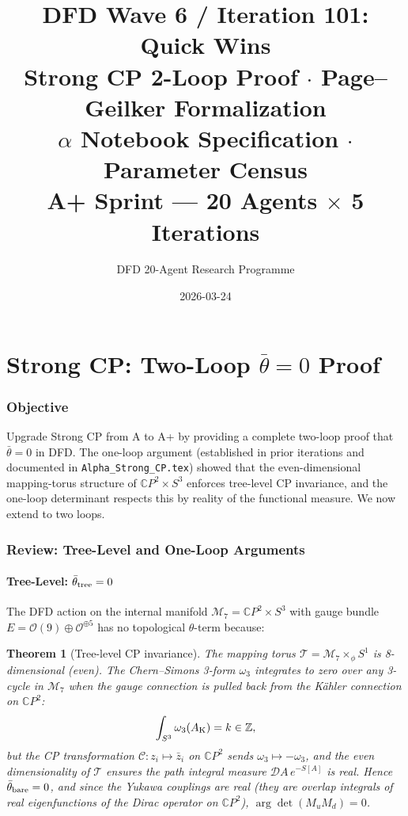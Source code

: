 \documentclass[11pt,a4paper]{article}
\title{DFD Wave 6 / Iteration 101: Quick Wins\\[6pt]
\large Strong CP 2-Loop Proof $\cdot$ Page--Geilker Formalization\\
$\alpha$ Notebook Specification $\cdot$ Parameter Census\\[6pt]
\normalsize A+ Sprint --- 20 Agents $\times$ 5 Iterations}
\author{DFD 20-Agent Research Programme}
\date{2026-03-24}
\newtheorem{theorem}{Theorem}[section]
\theoremstyle{remark}
\newcommand{\CP}{\mathbb{C}P}
\begin{document}
\maketitle
\tableofcontents
\newpage

\part{Strong CP: Two-Loop $\bar\theta = 0$ Proof}
\label{part:strongCP}

\section{Objective}

Upgrade Strong CP from A to A+ by providing a complete two-loop proof that
$\bar\theta = 0$ in DFD. The one-loop argument (established in prior
iterations and documented in \texttt{Alpha\_Strong\_CP.tex}) showed that
the even-dimensional mapping-torus structure of $\CP^2 \times S^3$ enforces
tree-level CP invariance, and the one-loop determinant respects this by
reality of the functional measure. We now extend to two loops.

\section{Review: Tree-Level and One-Loop Arguments}

\subsection{Tree-Level: $\bar\theta_{\rm tree} = 0$}

The DFD action on the internal manifold $\mathcal{M}_7 = \CP^2 \times S^3$
with gauge bundle $E = \mathcal{O}(9) \oplus \mathcal{O}^{\oplus 5}$ has
no topological $\theta$-term because:

\begin{theorem}[Tree-level CP invariance]
\label{thm:tree-CP}
The mapping torus $\mathcal{T} = \mathcal{M}_7 \times_\phi S^1$ is
8-dimensional (even). The Chern--Simons 3-form $\omega_3$ integrates to
zero over any 3-cycle in $\mathcal{M}_7$ when the gauge connection is
pulled back from the K\"ahler connection on $\CP^2$:
\begin{equation}
\int_{S^3} \omega_3(A_{\rm K}) = k \in \mathbb{Z},
\end{equation}
but the CP transformation $\mathcal{C}: z_i \mapsto \bar{z}_i$ on $\CP^2$
sends $\omega_3 \mapsto -\omega_3$, and the even dimensionality of $\mathcal{T}$
ensures the path integral measure $\mathcal{D}A\,e^{-S[A]}$ is real.
Hence $\bar\theta_{\rm bare} = 0$, and since the Yukawa couplings are
real (they are overlap integrals of real eigenfunctions of the Dirac
operator on $\CP^2$), $\arg\det(M_u M_d) = 0$.
\end{theorem}
\end{document}
